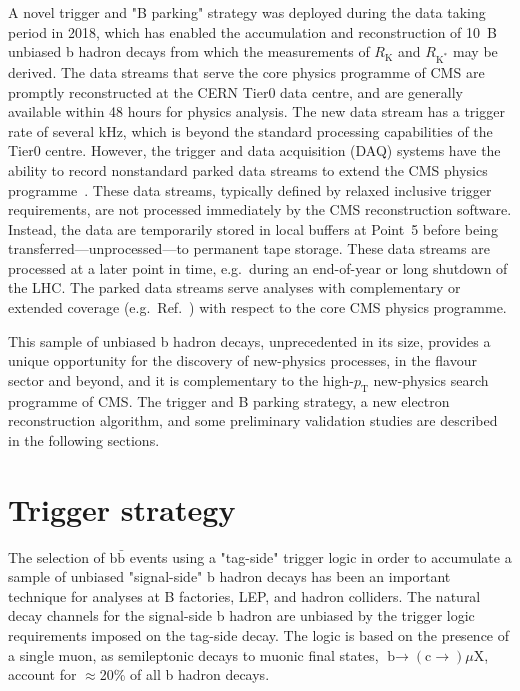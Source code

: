 \documentclass{webofc}
\newcommand{\bto}{\ensuremath{\textrm{b}{\rightarrow}}\xspace}
\newcommand{\rk}{\ensuremath{R_{\textrm{K}}}\xspace}
\newcommand{\rkst}{\ensuremath{R_{\textrm{K}^*}}\xspace}
\newcommand{\btoctomux}{\ensuremath{{\bto}(\textrm{c}{\rightarrow})\mu\textrm{X}}\xspace}
\newcommand{\bbar}{\ensuremath{\textrm{b}\bar{\textrm{b}}}\xspace}
\newcommand{\pt}{\ensuremath{p_\textrm{T}}\xspace}
\begin{document}
A novel trigger and "B parking" strategy was deployed during the data
taking period in 2018, which has enabled the accumulation and
reconstruction of 10~B unbiased b hadron decays from which the
measurements of \rk and \rkst may be derived. The data streams that
serve the core physics programme of CMS are promptly reconstructed at
the CERN Tier0 data centre, and are generally available within 48
hours for physics analysis. The new data stream has a trigger rate of
several kHz, which is beyond the standard processing capabilities of
the Tier0 centre. However, the trigger and data acquisition (DAQ)
systems have the ability to record nonstandard parked data streams to
extend the CMS physics programme~\cite{parking-dps}. These data
streams, typically defined by relaxed inclusive trigger requirements,
are not processed immediately by the CMS reconstruction software.
Instead, the data are temporarily stored in local buffers at Point~5
before being transferred---unprocessed---to permanent tape storage.
These data streams are processed at a later point in time, e.g.~during
an end-of-year or long shutdown of the LHC. The parked data streams
serve analyses with complementary or extended coverage
(e.g.~Ref.~\cite{alphat}) with respect to the core CMS physics
programme.

This sample of unbiased b hadron decays, unprecedented in its size,
provides a unique opportunity for the discovery of new-physics
processes, in the flavour sector and beyond, and it is complementary
to the high-\pt new-physics search programme of CMS. The trigger and B
parking strategy, a new electron reconstruction algorithm, and some
preliminary validation studies are described in the following
sections.

\section{Trigger strategy}
\label{sec:2}

The selection of \bbar events using a "tag-side" trigger logic in
order to accumulate a sample of unbiased "signal-side" b hadron decays
has been an important technique for analyses at B factories, LEP, and
hadron colliders. The natural decay channels for the signal-side b
hadron are unbiased by the trigger logic requirements imposed on the
tag-side decay. The logic is based on the presence of a single muon,
as semileptonic decays to muonic final states, \btoctomux, account for
${\approx}$20\% of all b hadron decays.
\end{document}
